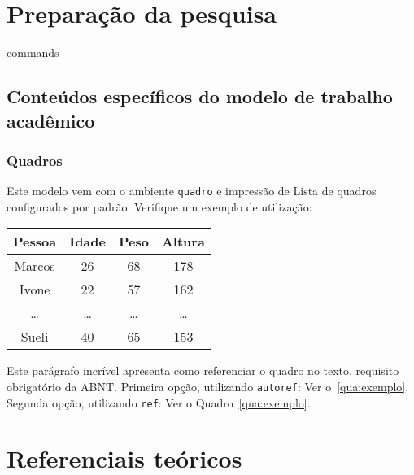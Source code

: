 \part{Preparação da pesquisa}

{commands}

\chapter{Conteúdos específicos do modelo de trabalho acadêmico}%
\label{ch:trabalho_academico}

\section{Quadros}

Este modelo vem com o ambiente \texttt{quadro} e impressão de Lista de quadros
configurados por padrão. Verifique um exemplo de utilização:

\begin{quadro}[htb]
\caption{%
\label{qua:exemplo}Exemplo de quadro}
\begin{tabular}{cccc}
    \toprule
    \textbf{Pessoa} & \textbf{Idade} & \textbf{Peso} & \textbf{Altura} \\
    \midrule
    Marcos          & 26             & 68            & 178             \\
    Ivone           & 22             & 57            & 162             \\
    \ldots          & \ldots         & \ldots        & \ldots          \\
    Sueli           & 40             & 65            & 153             \\
    \bottomrule
\end{tabular}
\end{quadro}

Este parágrafo incrível apresenta como referenciar o quadro no texto, requisito
obrigatório da ABNT.\@
Primeira opção, utilizando \texttt{autoref}: Ver o~\autoref{qua:exemplo}.
Segunda opção, utilizando \texttt{ref}: Ver o Quadro~\ref{qua:exemplo}.

\part{Referenciais teóricos}
